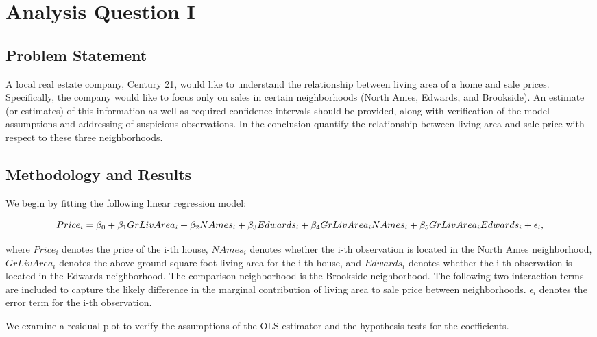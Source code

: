 \documentclass[american,]{article}
\begin{document}
\section{Analysis Question I}\label{analysis-question-i}

\subsection{Problem Statement}\label{problem-statement}

A local real estate company, Century 21, would like to understand the
relationship between living area of a home and sale prices.
Specifically, the company would like to focus only on sales in certain
neighborhoods (North Ames, Edwards, and Brookside). An estimate (or
estimates) of this information as well as required confidence intervals
should be provided, along with verification of the model assumptions and
addressing of suspicious observations. In the conclusion quantify the
relationship between living area and sale price with respect to these
three neighborhoods.

\subsection{Methodology and Results}\label{methodology-and-results}

We begin by fitting the following linear regression model:

\begin{equation}
Price_i = {\beta_0} + {\beta_1}GrLivArea_{i} + {\beta_2}NAmes_{i} + {\beta_3}Edwards_{i} + {\beta_4}GrLivArea_{i}\*NAmes_{i}
+ {\beta_5}GrLivArea_{i}\*Edwards_{i}
+ {\epsilon_i},
\end{equation}

where \(Price_i\) denotes the price of the i-th house, \(NAmes_i\)
denotes whether the i-th observation is located in the North Ames
neighborhood, \(GrLivArea_i\) denotes the above-ground square foot
living area for the i-th house, and \(Edwards_i\) denotes whether the
i-th observation is located in the Edwards neighborhood. The comparison
neighborhood is the Brookside neighborhood. The following two
interaction terms are included to capture the likely difference in the
marginal contribution of living area to sale price between
neighborhoods. \(\epsilon_i\) denotes the error term for the i-th
observation.

We examine a residual plot to verify the assumptions of the OLS
estimator and the hypothesis tests for the coefficients.
\end{document}

